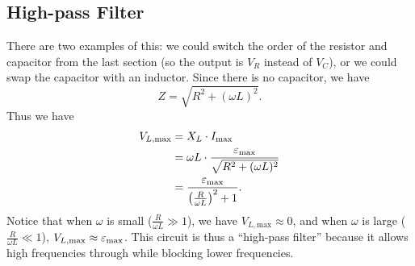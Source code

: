 \documentclass[class=article, crop=false]{standalone}
\begin{document}
  \subsection{High-pass Filter}
  There are two examples of this: we could switch the order of the resistor and capacitor from the last section (so the output is $V_R$ instead of $V_C$), or we could swap the capacitor with an inductor. Since there is no capacitor, we have
  \[
    Z = \sqrt{R^2 + (\omega L)^2}.
  \]
  Thus we have
  \begin{align*}
    V_{L,\text{max}} &= X_L\cdot I_\text{max} \\
                     &= \omega L \cdot \frac{\varepsilon_\text{max}}{\sqrt{R^2 + (\omega L)^2}} \\
                     &= \frac{\varepsilon_\text{max}}{\left( \frac{R}{\omega L} \right)^2 + 1}.
  \end{align*}
  Notice that when $\omega$ is small ($\frac{R}{\omega L}\gg 1$), we have $V_{L,\text{max}}\approx 0$, and when $\omega$ is large ($\frac{R}{\omega L}\ll 1$), $V_{L,\text{max}}\approx \varepsilon_\text{max}$. This circuit is thus a ``high-pass filter'' because it allows high frequencies through while blocking lower frequencies.
\end{document}
